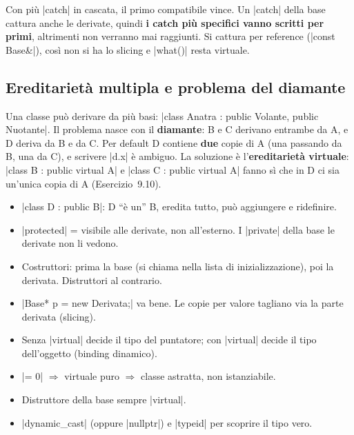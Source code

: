Con più \cc|catch| in cascata, il primo compatibile vince. Un \cc|catch| della base
cattura anche le derivate, quindi \textbf{i catch più specifici vanno scritti per
primi}, altrimenti non verranno mai raggiunti. Si cattura per reference
(\cc|const Base&|), così non si ha lo slicing e \cc|what()| resta virtuale.

\subsection*{Ereditarietà multipla e problema del diamante}

Una classe può derivare da più basi: \cc|class Anatra : public Volante, public Nuotante|.
Il problema nasce con il \textbf{diamante}: B e C derivano entrambe da A, e D deriva da
B e da C. Per default D contiene \textbf{due} copie di A (una passando da B, una da C), e
scrivere \cc|d.x| è ambiguo. La soluzione è l'\textbf{ereditarietà virtuale}:
\cc|class B : public virtual A| e \cc|class C : public virtual A| fanno sì che in D ci sia
un'unica copia di A (Esercizio~9.10).

\begin{inparole}
\begin{itemize}
  \item \cc|class D : public B|: D ``è un'' B, eredita tutto, può aggiungere e ridefinire.
  \item \cc|protected| = visibile alle derivate, non all'esterno. I \cc|private| della
        base le derivate non li vedono.
  \item Costruttori: prima la base (si chiama nella lista di inizializzazione), poi la
        derivata. Distruttori al contrario.
  \item \cc|Base* p = new Derivata;| va bene. Le copie per valore tagliano via la parte
        derivata (slicing).
  \item Senza \cc|virtual| decide il tipo del puntatore; con \cc|virtual| decide il tipo
        dell'oggetto (binding dinamico).
  \item \cc|= 0| $\Rightarrow$ virtuale puro $\Rightarrow$ classe astratta, non
        istanziabile.
  \item Distruttore della base sempre \cc|virtual|.
  \item \cc|dynamic_cast| (oppure \cc|nullptr|) e \cc|typeid| per scoprire il tipo vero.
\end{itemize}
\end{inparole}

